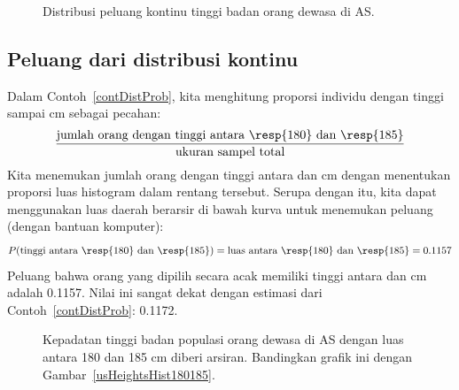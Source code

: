 \begin{figure}[tbh]
\centering
{}
\caption{Distribusi peluang kontinu tinggi badan orang dewasa di AS.}
\label{fdicHeightContDist}
\end{figure}



\D{\newpage}

\subsection{Peluang dari distribusi kontinu}

Dalam Contoh~\ref{contDistProb}, kita menghitung proporsi individu dengan tinggi  sampai  cm sebagai pecahan:
\begin{align*}
\frac{\text{jumlah orang dengan tinggi antara \resp{180} dan \resp{185}}}{\text{ukuran sampel total}}
\end{align*}
Kita menemukan jumlah orang dengan tinggi antara  dan  cm dengan menentukan proporsi luas histogram dalam rentang tersebut. Serupa dengan itu, kita dapat menggunakan luas daerah berarsir di bawah kurva untuk menemukan peluang (dengan bantuan komputer):
\begin{align*}
P(\text{tinggi antara \resp{180} dan \resp{185}})
	= \text{luas antara \resp{180} dan \resp{185}}
	= 0.1157
\end{align*}
Peluang bahwa orang yang dipilih secara acak memiliki tinggi antara  dan  cm adalah 0.1157. Nilai ini sangat dekat dengan estimasi dari Contoh~\ref{contDistProb}: 0.1172.

\begin{figure}[h]
  \centering
  \caption{Kepadatan tinggi badan populasi orang dewasa di AS
      dengan luas antara 180 dan 185 cm diberi arsiran.
      Bandingkan grafik ini dengan Gambar~\ref{usHeightsHist180185}.}
  \label{fdicHeightContDistFilled}
\end{figure}

